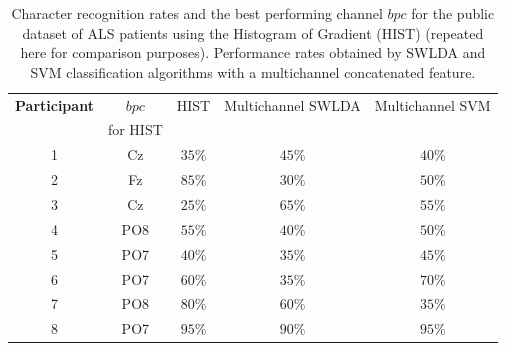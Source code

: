 \begin{table}[htb]
\caption[Character Recognition Rates for ALS patient's dataset]{Character recognition rates and the best performing channel $bpc$ for the public dataset of ALS patients using the Histogram of Gradient (HIST) (repeated here for comparison purposes). Performance rates obtained by SWLDA and SVM classification algorithms with a multichannel concatenated feature.}
\centering
\begin{tabular}{c|cc|c|c}
\toprule
\textbf{Participant}	&  $bpc$	&  HIST & Multichannel SWLDA & Multichannel SVM \\
                                    &  for HIST        &           &                                       &   \\
\midrule
1     &     Cz   &   $35\%$  & $45\%$  & $40\%$\\
2     &     Fz   &   $85\%$  & $30\%$   & $50\%$   \\
3     &     Cz   &   $25\%$  & $65\%$ & $55\%$   \\
4     &     PO8 &   $55\%$ & $40\%$  & $50\%$   \\
5     &     PO7 &   $40\%$ & $35\%$  & $45\%$   \\
6     &     PO7 &   $60\%$ &  $35\%$  & $70\%$   \\
7     &     PO8 &   $80\%$ & $60\%$   & $35\%$   \\
8     &     PO7 &   $95\%$  & $90\%$   & $95\%$  \\

\end{tabular}
\label{tab:resultsalsswlda}
\end{table}





